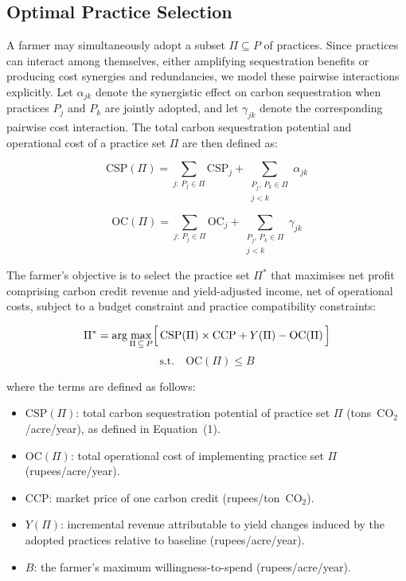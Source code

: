 \documentclass[manuscript, screen]{acmart}
\begin{document}
\subsection{Optimal Practice Selection}

A farmer may simultaneously adopt a subset $\Pi \subseteq P$ of practices.
Since practices can interact among themselves, either amplifying sequestration
benefits or producing cost synergies and redundancies, we model these pairwise
interactions explicitly. Let $\alpha_{jk}$ denote the synergistic effect on
carbon sequestration when practices $P_j$ and $P_k$ are jointly adopted, and
let $\gamma_{jk}$ denote the corresponding pairwise cost interaction. The total
carbon sequestration potential and operational cost of a practice set $\Pi$ are
then defined as:

\begin{equation}
    \text{CSP}(\Pi) = \sum_{j:\, P_j \in \Pi} \text{CSP}_j
    + \sum_{\substack{P_j,\, P_k \in \Pi \\ j < k}} \alpha_{jk}
\end{equation}

\begin{equation}
    \text{OC}(\Pi) = \sum_{j:\, P_j \in \Pi} \text{OC}_j
    + \sum_{\substack{P_j,\, P_k \in \Pi \\ j < k}} \gamma_{jk}
\end{equation}

The farmer's objective is to select the practice set $\Pi^*$ that maximises
net profit comprising carbon credit revenue and yield-adjusted income, net of
operational costs, subject to a budget constraint and practice compatibility
constraints:

\begin{equation}
    \Pi^* = \arg\max_{\Pi \,\subseteq\, P}
    \Bigl[\,\text{CSP}(\Pi) \times \text{CCP} + Y(\Pi) - \text{OC}(\Pi)\,\Bigr]
\end{equation}
\begin{equation*}
    \text{s.t.} \quad \text{OC}(\Pi) \leq B
\end{equation*}

\noindent where the terms are defined as follows:
\begin{itemize}
    \item $\text{CSP}(\Pi)$: total carbon sequestration potential of practice set $\Pi$ (tons~CO$_2$/acre/year), as defined in Equation~(1).
    \item $\text{OC}(\Pi)$: total operational cost of implementing practice set $\Pi$ (rupees/acre/year).
    \item $\text{CCP}$: market price of one carbon credit (rupees/ton~CO$_2$).
    \item $Y(\Pi)$: incremental revenue attributable to yield changes induced by the adopted practices relative to baseline (rupees/acre/year).
    \item $B$: the farmer's maximum willingness-to-spend (rupees/acre/year).
\end{itemize}
\end{document}

